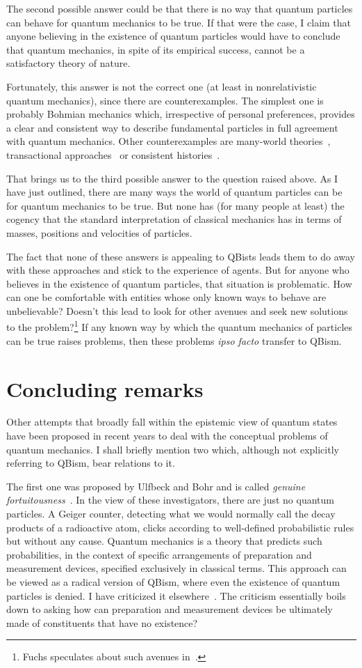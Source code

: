 \documentclass[12pt]{article}
\begin{document}
The second possible answer could be that
there is no way that quantum particles
can behave for quantum mechanics to be
true.  If that were the case, I claim that
anyone believing in the existence of quantum
particles would have to conclude that quantum
mechanics, in spite of its empirical success,
cannot be a satisfactory theory of nature.

Fortunately, this answer is not the correct
one (at least in nonrelativistic quantum
mechanics), since there are counterexamples.
The simplest one is probably Bohmian
mechanics which, irrespective of personal
preferences, provides a clear and consistent 
way to describe fundamental particles in full
agreement with quantum mechanics.  Other
counterexamples are many-world
theories~\cite{saunders},
transactional approaches~\cite{kastner}
or consistent histories~\cite{griffiths}.

That brings us to the third possible answer
to the question raised above. As I have
just outlined, there are many ways the world
of quantum particles can be for quantum
mechanics to be true.  But none has (for
many people at least) the cogency that the
standard interpretation of classical
mechanics has in terms of masses,
positions and velocities of particles.

The fact that none of these answers is
appealing to QBists leads them to do away
with these approaches and stick to the
experience of agents.  But for anyone
who believes in the existence of quantum
particles, that situation is problematic.
How can one be comfortable with entities
whose only known ways to behave are
unbelievable?  Doesn't this lead to look
for other avenues and seek new solutions
to the problem?\footnote{Fuchs speculates
about such avenues in~\cite{fuchs3}.}
If any known way by which the quantum
mechanics of particles can be true raises
problems, then these problems
\emph{ipso facto} transfer to QBism.
%
\section{Concluding remarks\label{S5}}
%
Other attempts that broadly fall within
the epistemic view of quantum states
have been proposed in recent years to
deal with the conceptual problems of
quantum mechanics.  I shall briefly
mention two which, although not
explicitly referring to QBism, bear
relations to it.

The first one was proposed by Ulfbeck
and Bohr and is called \emph{genuine
fortuitousness}~\cite{ulfbeck}.  In the
view of these investigators,
there are just no quantum particles.
A Geiger counter, detecting what we would
normally call the decay products of a
radioactive atom, clicks according to
well-defined probabilistic rules but
without any cause.  Quantum mechanics
is a theory that predicts such probabilities,
in the context of specific arrangements
of preparation and measurement devices,
specified exclusively in classical terms.
This approach can be viewed as a radical
version of QBism, where even the existence
of quantum particles is denied.  I have
criticized it elsewhere~\cite{marchildon2}.
The criticism essentially boils down to
asking how can preparation and measurement
devices be ultimately made of constituents
that have no existence?
\end{document}
